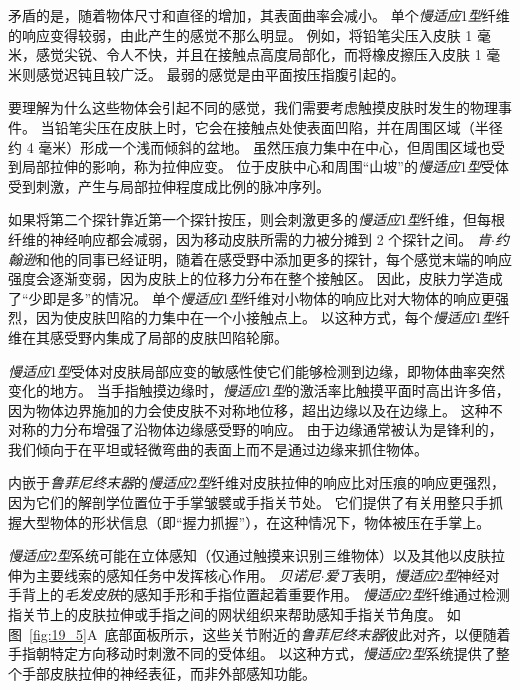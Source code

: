 矛盾的是，随着物体尺寸和直径的增加，其表面曲率会减小。
单个\textit{慢适应}1\textit{型}纤维的响应变得较弱，由此产生的感觉不那么明显。
例如，将铅笔尖压入皮肤 1 毫米，感觉尖锐、令人不快，并且在接触点高度局部化，而将橡皮擦压入皮肤 1 毫米则感觉迟钝且较广泛。
最弱的感觉是由平面按压指腹引起的。


要理解为什么这些物体会引起不同的感觉，我们需要考虑触摸皮肤时发生的物理事件。
当铅笔尖压在皮肤上时，它会在接触点处使表面凹陷，并在周围区域（半径约 4 毫米）形成一个浅而倾斜的盆地。
虽然压痕力集中在中心，但周围区域也受到局部拉伸的影响，称为拉伸应变。
位于皮肤中心和周围“山坡”的\textit{慢适应}1\textit{型}受体受到刺激，产生与局部拉伸程度成比例的脉冲序列。


如果将第二个探针靠近第一个探针按压，则会刺激更多的\textit{慢适应}1\textit{型}纤维，但每根纤维的神经响应都会减弱，因为移动皮肤所需的力被分摊到 2 个探针之间。
\textit{肯$\cdot$约翰逊}和他的同事已经证明，随着在感受野中添加更多的探针，每个感觉末端的响应强度会逐渐变弱，因为皮肤上的位移力分布在整个接触区。
因此，皮肤力学造成了“少即是多”的情况。
单个\textit{慢适应}1\textit{型}纤维对小物体的响应比对大物体的响应更强烈，因为使皮肤凹陷的力集中在一个小接触点上。
以这种方式，每个\textit{慢适应}1\textit{型}纤维在其感受野内集成了局部的皮肤凹陷轮廓。


\textit{慢适应}1\textit{型}受体对皮肤局部应变的敏感性使它们能够检测到边缘，即物体曲率突然变化的地方。
当手指触摸边缘时，\textit{慢适应}1\textit{型}的激活率比触摸平面时高出许多倍，因为物体边界施加的力会使皮肤不对称地位移，超出边缘以及在边缘上。
这种不对称的力分布增强了沿物体边缘感受野的响应。
由于边缘通常被认为是锋利的，我们倾向于在平坦或轻微弯曲的表面上而不是通过边缘来抓住物体。


内嵌于\textit{鲁菲尼终末器}的\textit{慢适应}2\textit{型}纤维对皮肤拉伸的响应比对压痕的响应更强烈，因为它们的解剖学位置位于手掌皱襞或手指关节处。
它们提供了有关用整只手抓握大型物体的形状信息（即“握力抓握”），在这种情况下，物体被压在手掌上。


\textit{慢适应}2\textit{型}系统可能在立体感知（仅通过触摸来识别三维物体）以及其他以皮肤拉伸为主要线索的感知任务中发挥核心作用。
\textit{贝诺尼$\cdot$爱丁}表明，\textit{慢适应}2\textit{型}神经对手背上的\textit{毛发皮肤}的感知手形和手指位置起着重要作用。
\textit{慢适应}2\textit{型}纤维通过检测指关节上的皮肤拉伸或手指之间的网状组织来帮助感知手指关节角度。
如图~\ref{fig:19_5}A~底部面板所示，这些关节附近的\textit{鲁菲尼终末器}彼此对齐，以便随着手指朝特定方向移动时刺激不同的受体组。
以这种方式，\textit{慢适应}2\textit{型}系统提供了整个手部皮肤拉伸的神经表征，而非外部感知功能。



